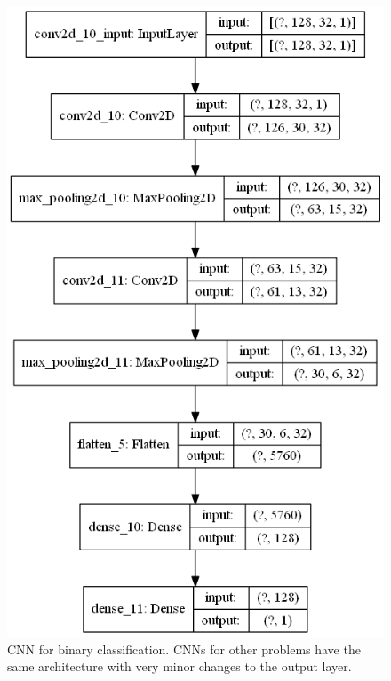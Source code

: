 \documentclass{article}
\begin{document}
\begin{figure}
   \centering
    \includegraphics[totalheight=16cm]{circle_id/binary/model.png}
  \caption{\label{fig:binary_model} CNN for binary classification. CNNs for other problems have the same architecture with very minor changes to the output layer.}
\end{figure}
%
\end{document}
